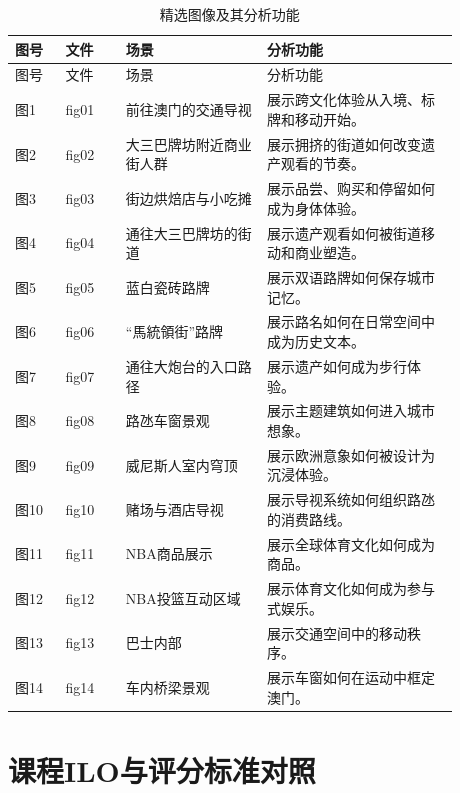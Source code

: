 \documentclass[12pt,a4paper]{article}
\begin{document}
\begin{longtable}{>{\raggedright\arraybackslash}p{0.1\linewidth}>{\raggedright\arraybackslash}p{0.12\linewidth}>{\raggedright\arraybackslash}p{0.28\linewidth}>{\raggedright\arraybackslash}p{0.38\linewidth}}
\caption{精选图像及其分析功能}\\
\toprule
图号 & 文件 & 场景 & 分析功能 \\
\midrule
\endfirsthead
\toprule
图号 & 文件 & 场景 & 分析功能 \\
\midrule
\endhead
图1 & fig01 & 前往澳门的交通导视 & 展示跨文化体验从入境、标牌和移动开始。 \\
图2 & fig02 & 大三巴牌坊附近商业街人群 & 展示拥挤的街道如何改变遗产观看的节奏。 \\
图3 & fig03 & 街边烘焙店与小吃摊 & 展示品尝、购买和停留如何成为身体体验。 \\
图4 & fig04 & 通往大三巴牌坊的街道 & 展示遗产观看如何被街道移动和商业塑造。 \\
图5 & fig05 & 蓝白瓷砖路牌 & 展示双语路牌如何保存城市记忆。 \\
图6 & fig06 & ``馬統領街''路牌 & 展示路名如何在日常空间中成为历史文本。 \\
图7 & fig07 & 通往大炮台的入口路径 & 展示遗产如何成为步行体验。 \\
图8 & fig08 & 路氹车窗景观 & 展示主题建筑如何进入城市想象。 \\
图9 & fig09 & 威尼斯人室内穹顶 & 展示欧洲意象如何被设计为沉浸体验。 \\
图10 & fig10 & 赌场与酒店导视 & 展示导视系统如何组织路氹的消费路线。 \\
图11 & fig11 & NBA商品展示 & 展示全球体育文化如何成为商品。 \\
图12 & fig12 & NBA投篮互动区域 & 展示体育文化如何成为参与式娱乐。 \\
图13 & fig13 & 巴士内部 & 展示交通空间中的移动秩序。 \\
图14 & fig14 & 车内桥梁景观 & 展示车窗如何在运动中框定澳门。 \\
\bottomrule
\end{longtable}

\section{课程ILO与评分标准对照}
\end{document}
